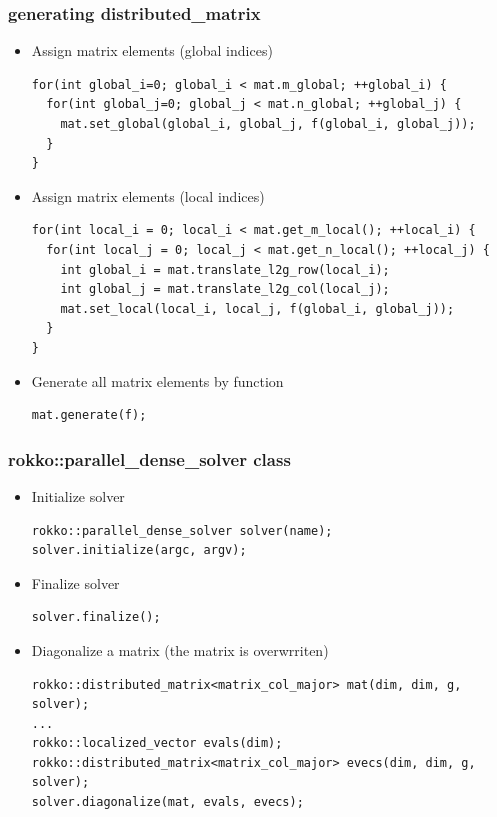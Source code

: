 \begin{frame}[c,fragile]
  \frametitle{generating distributed_matrix}
  \begin{itemize}
  \item Assign matrix elements (global indices)
\begin{lstlisting}
for(int global_i=0; global_i < mat.m_global; ++global_i) {
  for(int global_j=0; global_j < mat.n_global; ++global_j) {
    mat.set_global(global_i, global_j, f(global_i, global_j));
  }
}
\end{lstlisting}
  \item Assign matrix elements (local indices)
\begin{lstlisting}
for(int local_i = 0; local_i < mat.get_m_local(); ++local_i) {
  for(int local_j = 0; local_j < mat.get_n_local(); ++local_j) {
    int global_i = mat.translate_l2g_row(local_i);
    int global_j = mat.translate_l2g_col(local_j);
    mat.set_local(local_i, local_j, f(global_i, global_j));
  }
}
\end{lstlisting}
  \item Generate all matrix elements by function
\begin{lstlisting}
mat.generate(f);
\end{lstlisting}
  \end{itemize}
\end{frame}

\begin{frame}[c,fragile]
  \frametitle{rokko::parallel_dense_solver class}
  \begin{itemize}
  \item Initialize solver
\begin{lstlisting}
rokko::parallel_dense_solver solver(name);
solver.initialize(argc, argv);
\end{lstlisting}
  \item Finalize solver
\begin{lstlisting}
solver.finalize();
\end{lstlisting}
  \item Diagonalize a matrix (the matrix is overwrriten)
\begin{lstlisting}
rokko::distributed_matrix<matrix_col_major> mat(dim, dim, g, solver);
...
rokko::localized_vector evals(dim);
rokko::distributed_matrix<matrix_col_major> evecs(dim, dim, g, solver);
solver.diagonalize(mat, evals, evecs);
\end{lstlisting}
  \end{itemize}
\end{frame}

